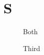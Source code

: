\documentclass{article}
\begin{document}
\section{S}
\begin{figure}
\caption{Both}\label{f1}
\end{figure}
\begin{center}\label{f2}\end{center}
\begin{figure}\caption{Third}\label{f3}\end{figure}
\begin{table}
\caption{Tab}\label{t1}
\end{table}
\end{document}
